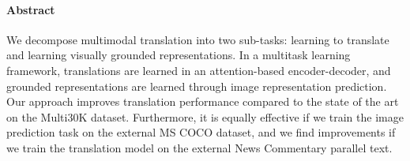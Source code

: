 \paragraph{Abstract}

We decompose multimodal translation into two sub-tasks: learning to translate and learning visually grounded representations. In a multitask learning framework, translations are learned in an attention-based encoder-decoder, and grounded representations are learned through image representation prediction. Our approach improves translation performance compared to the state of the art on the Multi30K dataset. Furthermore, it is equally effective if we train the image prediction task on the external MS COCO dataset, and we find improvements if we train the translation model on the external News Commentary parallel text.
